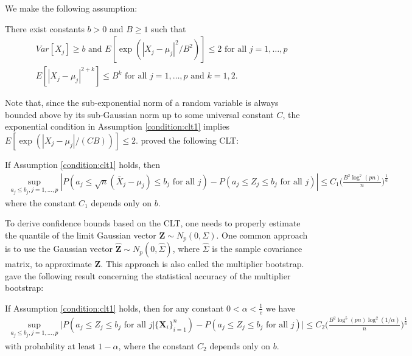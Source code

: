 \documentclass[mnsc,blindrev]{informs4} %
\newcommand{\abs}[1]{\left \vert #1 \right\vert}
\begin{document}
We make the following assumption:
\begin{assumption}\label{condition:clt1}
There exist constants $b>0$ and $B\geq 1$ such that
\begin{align*}
&Var[X_{j}]\geq b\text{ and }E[\exp(\abs{X_{j}-\mu_j}^2/B^2)]\leq 2\text{ for all }j=1,\ldots,p\\
&E[\abs{X_{j}-\mu_j}^{2+k}]\leq B^k\text{ for all }j=1,\ldots,p\text{ and }k=1,2.
\end{align*}
\end{assumption}
Note that, since the sub-exponential norm of a random variable is always bounded above by its sub-Gaussian norm up to some universal constant $C$, the exponential condition in Assumption \ref{condition:clt1} implies $E[\exp(\abs{X_{j}-\mu_j}/(CB))]\leq 2$. \cite{chernozhukov2017central} proved the following CLT:
\begin{theorem}\label{clt1}
If Assumption \ref{condition:clt1} holds, then
\begin{align*}
\sup_{a_j\leq b_j,j=1,\ldots,p}\abs{P(a_j\leq \sqrt n(\bar{X}_j-\mu_j)\leq b_j\text{ for all }j)-P(a_j\leq Z_j\leq b_j\text{ for all }j)}\leq C_1\Big(\frac{B^2\log^7(pn)}{n}\Big)^{\frac{1}{6}}
\end{align*}
where the constant $C_1$ depends only on $b$.
\end{theorem}
To derive confidence bounds based on the CLT, one needs to properly estimate the quantile of the limit Gaussian vector $\mathbf Z\sim N_p(0,\Sigma)$. One common approach is to use the Gaussian vector $\widehat{\mathbf Z}\sim N_p(0,\widehat{\Sigma})$, where $\widehat{\Sigma}$ is the sample covariance matrix, to approximate $\mathbf Z$. This approach is also called the multiplier bootstrap. \cite{chernozhukov2017central} gave the following result concerning the statistical accuracy of the multiplier bootstrap:
\begin{theorem}\label{plugin1}
If Assumption \ref{condition:clt1} holds, then for any constant $0<\alpha<\frac{1}{e}$ we have
\begin{align*}
\sup_{a_j\leq b_j,j=1,\ldots,p}\Big\lvert P(a_j\leq \widehat{Z}_j\leq b_j\text{ for all }j\vert \{\mathbf X_i\}_{i=1}^n)-P(a_j\leq Z_j\leq b_j\text{ for all }j)\Big\rvert\leq C_2\Big(\frac{B^2\log^5(pn)\log^2(1/\alpha)}{n}\Big)^{\frac{1}{6}}
\end{align*}
with probability at least $1-\alpha$, where the constant $C_2$ depends only on $b$.
\end{theorem}
\end{document}
